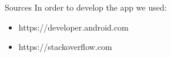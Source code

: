 Sources
In order to develop the app we used:
\begin{itemize}
\item https://developer.android.com
\item https://stackoverflow.com

\end{itemize}
